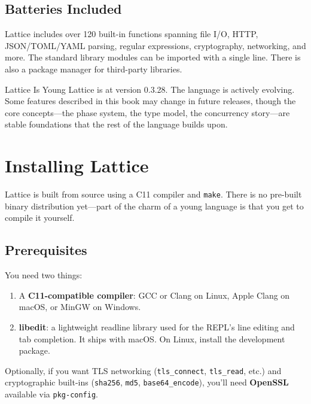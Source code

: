 \subsection{Batteries Included}\label{subsec:batteries}

Lattice includes over 120 built-in functions spanning file I/O, HTTP, JSON/TOML/YAML parsing, regular expressions, cryptography, networking, and more.
The standard library modules can be imported with a single line.
There is also a package manager for third-party libraries.

\begin{notebox}{Lattice Is Young}
Lattice is at version 0.3.28.
The language is actively evolving.
Some features described in this book may change in future releases, though the core concepts---the phase system, the type model, the concurrency story---are stable foundations that the rest of the language builds upon.
\end{notebox}

\section{Installing Lattice}\label{sec:installing-lattice}

Lattice is built from source using a C11 compiler and \texttt{make}.
There is no pre-built binary distribution yet---part of the charm of a young language is that you get to compile it yourself.

\subsection{Prerequisites}\label{subsec:prerequisites}

You need two things:

\begin{enumerate}
  \item A \textbf{C11-compatible compiler}: GCC or Clang on Linux, Apple Clang on macOS, or MinGW on Windows.
  \item \textbf{libedit}: a lightweight readline library used for the REPL's line editing and tab completion. It ships with macOS. On Linux, install the development package.
\end{enumerate}

Optionally, if you want TLS networking (\lstinline|tls_connect|, \lstinline|tls_read|, etc.) and cryptographic built-ins (\lstinline|sha256|, \lstinline|md5|, \lstinline|base64_encode|), you'll need \textbf{OpenSSL} available via \texttt{pkg-config}.

